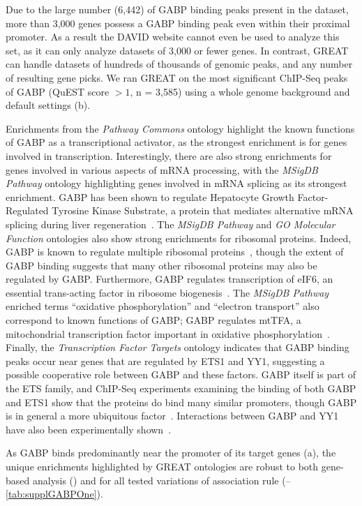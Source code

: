 Due to the large number (6,442) of GABP binding peaks present in the dataset,
more than 3,000 genes possess a GABP binding peak even within their proximal
promoter. As a result the DAVID website cannot even be used to analyze this
set, as it can only analyze datasets of 3,000 or fewer genes.
%
In contrast, GREAT can handle datasets of hundreds of thousands of genomic peaks,
and any number of resulting gene picks.  We ran GREAT on the most significant
ChIP-Seq peaks of GABP (QuEST score $> 1$, n = 3,585) using a whole genome
background and default settings (b).

Enrichments from the \emph{Pathway Commons} ontology highlight the known
functions of GABP as a transcriptional activator, as the strongest enrichment
is for genes involved in transcription.  Interestingly, there are also strong
enrichments for genes involved in various aspects of mRNA processing, with
the \emph{MSigDB Pathway} ontology highlighting genes involved in mRNA splicing
as its strongest enrichment.  GABP has been shown to regulate Hepatocyte Growth
Factor-Regulated Tyrosine Kinase Substrate, a
protein that mediates alternative mRNA splicing during liver
regeneration~\citep{Du1998,Rosmarin2004}.  The
\emph{MSigDB Pathway} and \emph{GO Molecular Function} ontologies also show
strong enrichments for ribosomal proteins.  Indeed, GABP is known to regulate
multiple ribosomal proteins~\citep{Curcic1997,Genuario1993}, though the
extent of GABP binding suggests that many other ribosomal proteins may also
be regulated by GABP.  Furthermore, GABP regulates transcription of eIF6, an
essential trans-acting factor in ribosome biogenesis~\citep{Donadini2006}.
The \emph{MSigDB Pathway} enriched terms ``oxidative phosphorylation'' and
``electron transport'' also correspond to known functions of GABP; GABP
regulates mtTFA, a mitochondrial transcription factor important in oxidative
phosphorylation~\citep{Chinenov2000}.  Finally, the \emph{Transcription
Factor Targets} ontology indicates that GABP binding peaks occur near genes
that are regulated by ETS1 and YY1, suggesting a possible cooperative role
between GABP and these factors.  GABP itself is part of the ETS family, and
ChIP-Seq experiments examining the binding of both GABP and ETS1 show that
the proteins do bind many similar promoters, though GABP is in general a more
ubiquitous factor~\citep{Collins2007}.  Interactions between GABP and YY1
have also been experimentally shown~\citep{Rosmarin2004,Delehouzee2005}.
%

As GABP binds predominantly near the promoter of its target genes
(a), the unique enrichments highlighted by GREAT
ontologies are robust to both gene-based analysis ()
and for all tested variations of association rule
(--\ref{tab:supplGABPOne}).

